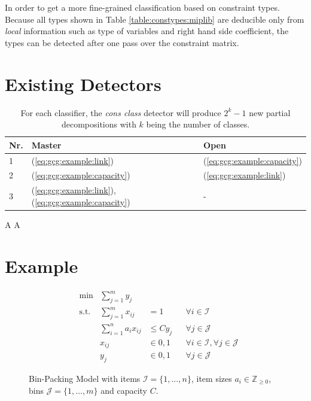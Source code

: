 				In order to get a more fine-grained classification based on constraint types.
				Because all types shown in Table \ref{table:constypes:miplib} are deducible only from \textit{local} information such as type of variables and right hand side coefficient, the types can be detected after one pass over the constraint matrix.
		\clearpage
	
	\section{Existing Detectors}
	
		\begin{table}[ht!]
			\centering
			\begin{tabular}{l|l|l}
				\textbf{Nr.} & \textbf{Master} & \textbf{Open} \\
				\toprule
				\toprule
				1 & (\ref{eq:gcg:example:link}) & (\ref{eq:gcg:example:capacity}) \\ 
				2 & (\ref{eq:gcg:example:capacity}) & (\ref{eq:gcg:example:link}) \\
				3 & (\ref{eq:gcg:example:link}), (\ref{eq:gcg:example:capacity}) & -
			\end{tabular}
			\caption{For each classifier, the \textit{cons class} detector will produce $2^k - 1$ new partial decompositions with $k$ being the number of classes.}
			\label{table:gcg:example:consclass}
		\end{table}
	
		\clearpage
		A\clearpage
		A\clearpage
	
	\section{Example}
	\label{chap:gcg:example}
	
		\begin{figure}[ht!]
			\centering
			\begin{align}
				&\min &\sum_{j=1}^m y_j \nonumber \\
				&\text{s.t.} &\sum_{j=1}^m x_{ij} &= 1 &&\forall i \in \mathcal{I} \label{eq:gcg:example:link} \\
				&& \sum_{i=1}^n a_i x_{ij} &\leq C y_j && \forall j \in \mathcal{J} \label{eq:gcg:example:capacity} \\
				&& x_{ij} &\in { 0, 1 } && \forall i \in \mathcal{I}, \forall j \in \mathcal{J} \nonumber \\
				&& y_j &\in { 0, 1 } && \forall j \in \mathcal{J} \nonumber
			\end{align}
			\caption{Bin-Packing Model with items $\mathcal{I} = \{ 1, \ldots, n \}$, item sizes $a_i \in \mathbb{Z}_{\geq 0}$, bins $\mathcal{J} = \{ 1, \ldots, m \}$ and capacity $C$.}
			\label{figure:gcg:example:binpack}
		\end{figure}
		
